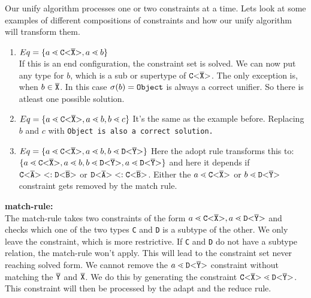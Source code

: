 Our unify algorithm processes one or two constraints at a time.
Lets look at some examples of different compositions of constraints
and how our unify algorithm will transform them.

\begin{enumerate}
\item $Eq = \{ a \lessdot \mathtt{C {\tt <} \overline{\tt X} {\tt >} }, a \lessdot b \}$ \\
If this is an end configuration, the constraint set is solved.
We can now put any type for $b$, which is a sub or supertype of $\mathtt{C {\tt <} \overline{\tt X} {\tt >} }$.
The only exception is, when $b \in \overline{\tt X}$.
In this case $\sigma(b) = \tt{Object}$ is always a correct unifier.
So there is atleast one possible solution.

\item $Eq = \{ a \lessdot \mathtt{C {\tt <} \overline{\tt X} {\tt >} }, a \lessdot b, b \lessdot c \}$
It's the same as the example before.
Replacing $b$ and $c$ with \tt{Object} is also a correct solution. 

\item $Eq = \{ a \lessdot \mathtt{C {\tt <} \overline{\tt X} {\tt >} }, a \lessdot b, b \lessdot \mathtt{D {\tt <} \overline{\tt Y} {\tt >} } \}$
Here the adopt rule transforms this to:
$\{ a \lessdot \mathtt{C {\tt <} \overline{\tt X} {\tt >} }, a \lessdot b, b \lessdot \mathtt{D {\tt <} \overline{\tt Y} {\tt >} }, a \lessdot \mathtt{D {\tt <} \overline{\tt Y} {\tt >} } \}$
and here it depends if $\mathtt{C {\tt <} \overline{\tt A} {\tt >} } <: \mathtt{D {\tt <} \overline{\tt B} {\tt >} }$ or $\mathtt{D {\tt <} \overline{\tt A} {\tt >} } <: \mathtt{C {\tt <} \overline{\tt B} {\tt >} }$.
Either the $a \lessdot \mathtt{C {\tt <} \overline{\tt X} {\tt >} }$ or $b \lessdot \mathtt{D {\tt <} \overline{\tt Y} {\tt >} }$ constraint
gets removed by the match rule.


\end{enumerate}

\textbf{match-rule:}\\
The match-rule takes two constraints of the form $a \lessdot \mathtt{C {\tt <} \overline{\tt X} {\tt >} }, a \lessdot \mathtt{D {\tt <} \overline{\tt Y} {\tt >} }$
and checks which one of the two types \texttt{C} and \texttt{D} is a subtype of the other.
We only leave the constraint, which is more restrictive.
If \texttt{C} and \texttt{D} do not have a subtype relation, the match-rule won't apply.
This will lead to the constraint set never reaching solved form.
We cannot remove the $a \lessdot \mathtt{D {\tt <} \overline{\tt Y} {\tt >} }$ constraint without matching the
$\overline{\tt Y}$ and $\overline{\tt X}$.
We do this by generating the constraint $\mathtt{C {\tt <} \overline{\tt X} {\tt >} } \lessdot \mathtt{D {\tt <} \overline{\tt Y} {\tt >} }$.
This constraint will then be processed by the adapt and the reduce rule.

